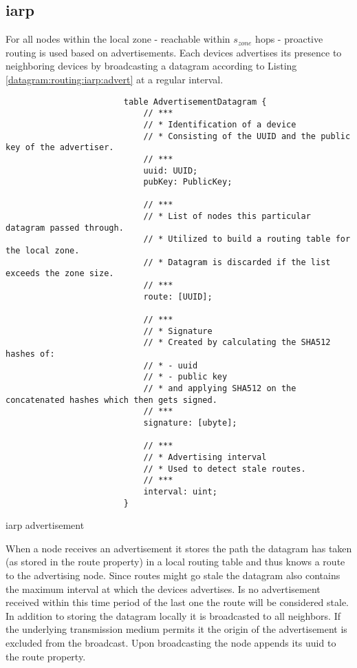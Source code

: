 \documentclass[a4paper]{report}
\begin{document}
	        \subsection[\acrshort{iarp}]{\acrlong{iarp}}
	            For all nodes within the local zone - reachable within $s_{zone}$ hops - proactive routing is used based on advertisements. Each devices advertises its presence to neighboring devices by broadcasting a \gls{datagram} according to Listing \ref{datagram:routing:iarp:advert} at a regular interval.
	            \begin{listing}
	                \begin{verbatim}
                        table AdvertisementDatagram {
                            // ***
                            // * Identification of a device
                            // * Consisting of the UUID and the public key of the advertiser.
                            // ***
                            uuid: UUID;
                            pubKey: PublicKey;
                        
                            // ***
                            // * List of nodes this particular datagram passed through.
                            // * Utilized to build a routing table for the local zone.
                            // * Datagram is discarded if the list exceeds the zone size.
                            // ***
                            route: [UUID];
                        
                            // ***
                            // * Signature
                            // * Created by calculating the SHA512 hashes of:
                            // * - uuid
                            // * - public key
                            // * and applying SHA512 on the concatenated hashes which then gets signed.
                            // ***
                            signature: [ubyte];
                            
                            // ***
                            // * Advertising interval
                            // * Used to detect stale routes.
                            // ***
                            interval: uint;
                        }
	                \end{verbatim}
	                \caption{\acrshort{iarp} advertisement}
	                \label{datagram:routing:iarp:advert}
	            \end{listing}
	            When a \Gls{node} receives an advertisement it stores the path the \gls{datagram} has taken (as stored in the route property) in a local routing table and thus knows a route to the advertising \gls{node}. Since routes might go stale the datagram also contains the maximum interval at which the devices advertises. Is no advertisement received within this time period of the last one the route will be considered stale.\\
                In addition to storing the \gls{datagram} locally it is broadcasted to all neighbors. If the underlying transmission medium permits it the origin of the advertisement is excluded from the broadcast. Upon broadcasting the \gls{node} appends its \acrshort{uuid} to the route property.
	            
\end{document}
